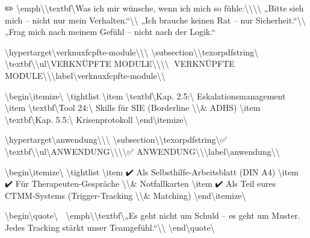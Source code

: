 ✏️ \textbackslash{}emph\textbackslash{}{\textbackslash{}textbf\textbackslash{}{Was ich mir wünsche, wenn ich mich so fühle:\textbackslash{}}\textbackslash{}}\textbackslash{}\textbackslash{}
„Bitte sieh mich -- nicht nur mein Verhalten.``\textbackslash{}\textbackslash{}
„Ich brauche keinen Rat -- nur Sicherheit.``\textbackslash{}\textbackslash{}
„Frag mich nach meinem Gefühl -- nicht nach der Logik.``

\textbackslash{}hypertarget\textbackslash{}{verknuxfcpfte-module\textbackslash{}}\textbackslash{}{\textbackslash{}%
\textbackslash{}subsection\textbackslash{}{\textbackslash{}texorpdfstring\textbackslash{}{🔗 \textbackslash{}textbf\textbackslash{}{\textbackslash{}ul\textbackslash{}{VERKNÜPFTE MODULE\textbackslash{}}\textbackslash{}}\textbackslash{}}\textbackslash{}{🔗 VERKNÜPFTE MODULE\textbackslash{}}\textbackslash{}}\textbackslash{}label\textbackslash{}{verknuxfcpfte-module\textbackslash{}}\textbackslash{}}

\textbackslash{}begin\textbackslash{}{itemize\textbackslash{}}
\textbackslash{}tightlist
\textbackslash{}item
  \textbackslash{}textbf\textbackslash{}{Kap. 2.5:\textbackslash{}} Eskalationsmanagement
\textbackslash{}item
  \textbackslash{}textbf\textbackslash{}{Tool 24:\textbackslash{}} Skills für SIE (Borderline \textbackslash{}\textbackslash{}& ADHS)
\textbackslash{}item
  \textbackslash{}textbf\textbackslash{}{Kap. 5.5:\textbackslash{}} Krisenprotokoll
\textbackslash{}end\textbackslash{}{itemize\textbackslash{}}

\textbackslash{}hypertarget\textbackslash{}{anwendung\textbackslash{}}\textbackslash{}{\textbackslash{}%
\textbackslash{}subsection\textbackslash{}{\textbackslash{}texorpdfstring\textbackslash{}{✅ \textbackslash{}textbf\textbackslash{}{\textbackslash{}ul\textbackslash{}{ANWENDUNG\textbackslash{}}\textbackslash{}}\textbackslash{}}\textbackslash{}{✅ ANWENDUNG\textbackslash{}}\textbackslash{}}\textbackslash{}label\textbackslash{}{anwendung\textbackslash{}}\textbackslash{}}

\textbackslash{}begin\textbackslash{}{itemize\textbackslash{}}
\textbackslash{}tightlist
\textbackslash{}item
  ✔️ Als Selbsthilfe-Arbeitsblatt (DIN A4)
\textbackslash{}item
  ✔️ Für Therapeuten-Gespräche \textbackslash{}\textbackslash{}& Notfallkarten
\textbackslash{}item
  ✔️ Als Teil eures CTMM-Systems (Trigger-Tracking \textbackslash{}\textbackslash{}& Matching)
\textbackslash{}end\textbackslash{}{itemize\textbackslash{}}

\textbackslash{}begin\textbackslash{}{quote\textbackslash{}}
💬 \textbackslash{}emph\textbackslash{}{\textbackslash{}textbf\textbackslash{}{„Es geht nicht um Schuld -- es geht um Muster. Jedes Tracking stärkt unser Teamgefühl.``\textbackslash{}}\textbackslash{}}
\textbackslash{}end\textbackslash{}{quote\textbackslash{}}
